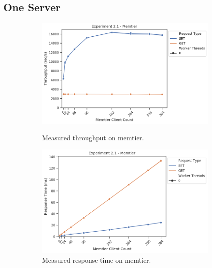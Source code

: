     \subsection{One Server\label{subsec:2_one-server}}

        \begin{figure}
            \vspace*{-.5\baselineskip}
                \centering
            \begin{subfigure}[t!]{0.45\textwidth}
                \centering
                \includegraphics[width=\textwidth]{../data_analysis/figures/2-1_mt_throughput.png}
                \caption{Measured throughput on memtier.\label{fig:21_mt_tp}}
                \includegraphics[width=\textwidth]{../data_analysis/figures/2-1_mt_response_time.png}
                \caption{Measured response time on memtier.\label{fig:21_mt_rt}}
            \end{subfigure}
            \begin{subfigure}[t!]{0.45\textwidth}

\end{subfigure}
\end{figure}
